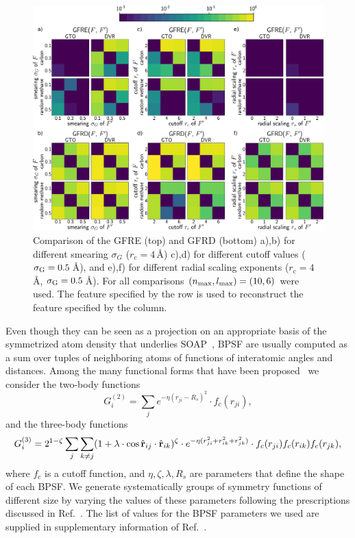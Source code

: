 \begin{figure}
    \includegraphics[width=0.9\linewidth]{fig/rof/sigma_radial_scaling_cutoff_comparison-gfrd-gto_dvr-methane_carbon-inkscaped-v2.pdf}
    \caption{Comparison of the GFRE (top) and GFRD (bottom) a),b) for different smearing  $\sigma_G$ ($r_\text{c}=4\,$\AA{}) c),d) for different cutoff values ($\sigma_\text{G}=0.5\,$\AA), and e),f) for different radial scaling exponents ($r_\text{c}=4\,$\AA{}, $\sigma_\text{G}=0.5\,$\AA). For all comparisons $(n_\mathrm{max},l_\mathrm{max}) = (10,6)$ were used. The feature specified by the row is used to reconstruct the feature specified by the column.}
    \label{fig:soap-sigma-radial-body}
\end{figure}

Even though they can be seen as a projection on an appropriate basis of the symmetrized atom density that underlies SOAP~\cite{will+19jcp}, BPSF are usually computed as a sum over tuples of neighboring atoms of functions of interatomic angles and distances. Among the many functional forms that have been proposed~\cite{behl11pccp} we consider the two-body functions
%
\begin{equation}
    G^{(2)}_i = \sum_j e^{-\eta (r_{ji} - R_s)^2} \cdot f_c (r_{ji}), \label{eq:g2}
\end{equation}
and the three-body functions
\begin{equation}
    G^{(3)}_i = 2^{1-\zeta} \sum_j \sum_{k \neq j } (1 + \lambda \cdot \cos \hat{\mathbf{r}}_{ij}\cdot\hat{\mathbf{r}}_{ik})^{\zeta} \cdot
    e^{-\eta (r_{ji}^2 + r_{ik}^2 + r_{jk}^2)} \cdot f_c(r_{ji}) f_c(r_{ik}) f_c(r_{jk}), \label{eq:g3}
\end{equation}
where $f_c$ is a cutoff function, and $\eta,\zeta,\lambda,R_s$ are parameters that define the shape of each BPSF. We generate systematically groups of symmetry functions of different size by varying the values of these parameters following the prescriptions discussed in Ref.~. The list of values for the BPSF parameters we used are supplied in supplementary information of Ref.~\cite{goscinski2021role}.

